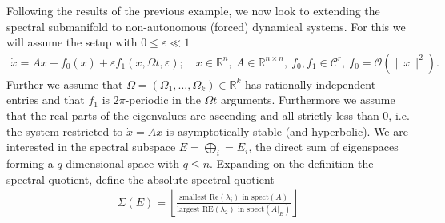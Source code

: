Following the results of the previous example, we now look to extending the spectral submanifold to non-autonomous (forced) dynamical systems. For this we will assume the setup with $0\leq \varepsilon \ll 1$
\begin{align}
	\dot{x} = Ax + f_0(x) + \varepsilon f_1(x, \Omega t, \varepsilon);\quad x \in \mathbb{R}^{n},\ A \in \mathbb{R}^{n\times n},\ f_0,f_1 \in \mathcal{C}^{r},\ f_0 = \mathcal{O}(\|x\|^2).
\end{align}
Further we assume that $\Omega = (\Omega_1,\ldots,\Omega_k)\in \mathbb{R}^{k}$ has rationally independent entries and that $f_1$ is $2\pi$-periodic in the $\Omega t$ arguments. Furthermore we assume that the real parts of the eigenvalues are ascending and all strictly less than 0, i.e. the system restricted to $\dot{x}=Ax$ is asymptotically stable (and hyperbolic). We are interested in the spectral subspace $E= \bigoplus_{i}=E_{i}$, the direct sum of eigenspaces forming a $q$ dimensional space with $q\leq n$. Expanding on the definition the spectral quotient, define the absolute spectral quotient 
\begin{align}
	\Sigma(E) = \left\lfloor \frac{ \textrm{smallest Re}(\lambda_i)  \textrm{ in spect} (A) }{ \textrm{largest RE} (\lambda _2)\textrm{ in spect} (A|_{E})} \right\rfloor
\end{align}

